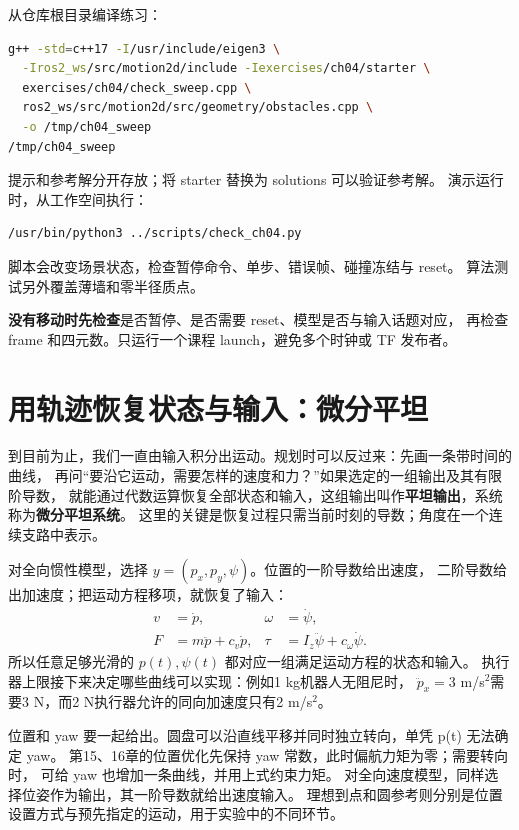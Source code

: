 从仓库根目录编译练习：
\begin{lstlisting}[language=bash,numbers=none]
g++ -std=c++17 -I/usr/include/eigen3 \
  -Iros2_ws/src/motion2d/include -Iexercises/ch04/starter \
  exercises/ch04/check_sweep.cpp \
  ros2_ws/src/motion2d/src/geometry/obstacles.cpp \
  -o /tmp/ch04_sweep
/tmp/ch04_sweep
\end{lstlisting}
提示和参考解分开存放；将 starter 替换为 solutions 可以验证参考解。
演示运行时，从工作空间执行：
\begin{lstlisting}[language=bash,numbers=none]
/usr/bin/python3 ../scripts/check_ch04.py
\end{lstlisting}
脚本会改变场景状态，检查暂停命令、单步、错误帧、碰撞冻结与 reset。
算法测试另外覆盖薄墙和零半径质点。

\begin{notebox}
\textbf{没有移动时先检查}\quad 是否暂停、是否需要 reset、模型是否与输入话题对应，
再检查 frame 和四元数。只运行一个课程 launch，避免多个时钟或 TF 发布者。
\end{notebox}

\section{用轨迹恢复状态与输入：微分平坦}\label{sec:flatness}
到目前为止，我们一直由输入积分出运动。规划时可以反过来：先画一条带时间的曲线，
再问“要沿它运动，需要怎样的速度和力？”如果选定的一组输出及其有限阶导数，
就能通过代数运算恢复全部状态和输入，这组输出叫作\textbf{平坦输出}，系统称为\textbf{微分平坦系统}。
这里的关键是恢复过程只需当前时刻的导数；角度在一个连续支路中表示。

对全向惯性模型，选择 $y=(p_x,p_y,\psi)$。位置的一阶导数给出速度，
二阶导数给出加速度；把运动方程移项，就恢复了输入：
\begin{align}
v&=\dot p,&\omega&=\dot\psi,\\
F&=m\ddot p+c_v\dot p,&\tau&=I_z\ddot\psi+c_\omega\dot\psi.
\end{align}
所以任意足够光滑的 $p(t),\psi(t)$ 都对应一组满足运动方程的状态和输入。
执行器上限接下来决定哪些曲线可以实现：例如1 kg机器人无阻尼时，
$\ddot p_x=3$ m/s$^2$需要3 N，而2 N执行器允许的同向加速度只有2 m/s$^2$。

位置和 yaw 要一起给出。圆盘可以沿直线平移并同时独立转向，单凭 p(t) 无法确定 yaw。
第15、16章的位置优化先保持 yaw 常数，此时偏航力矩为零；需要转向时，
可给 yaw 也增加一条曲线，并用上式约束力矩。
对全向速度模型，同样选择位姿作为输出，其一阶导数就给出速度输入。
理想到点和圆参考则分别是位置设置方式与预先指定的运动，用于实验中的不同环节。

